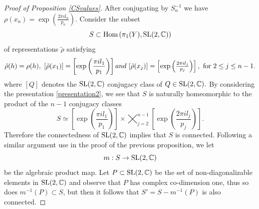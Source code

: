\begin{proof}[Proof of Proposition \ref{CSvalues}]
After conjugating by $S_n^{-1}$ we have $\rho(x_n)=\exp\left(\frac{2\pi i l_n}{p_n}\right).$ Consider the subset $$S\subset \text{Hom}\left(\pi_1(Y),\operatorname{SL}(2,\mathbb{C})\right) $$ of representations $\tilde{\rho}$ satisfying
\begin{equation}
\tilde{\rho}(h)=\rho(h), \ [\tilde{\rho}(x_1)]=\left[\exp\left(\frac{\pi il_1}{p_1}\right)\right]\, $$
and
$$\ [\tilde{\rho}(x_j)]=\left[\exp\left(\frac{2\pi il_j}{p_j}\right)\right], \ \text{for }2\leq j\leq n-1.
\end{equation}
where $[Q]$ denotes the $\operatorname{SL}(2,\mathbb{C})$ conjugacy class of $Q \in \operatorname{SL}(2,\mathbb{C}).$ By considering the presentation \eqref{presentation2}, we see that $S$ is naturally homeomorphic to the product of the $n-1$ conjugacy classes
\begin{equation}
S\simeq \left[\exp\left(\frac{\pi il_1}{p_1}\right)\right]\times  \bigtimes_{j=2}^{n-1} \left[\exp\left(\frac{2\pi il_j}{p_j}\right)\right].
\end{equation}
 Therefore the connectedness of $\operatorname{SL}(2,\mathbb{C})$ implies that $S$ is connected. Following a similar argument use in the proof of the previous proposition, we let 
 $$m : S \rightarrow \operatorname{SL}(2,\mathbb{C})$$
  be the algebraic product map. Let $P\subset \operatorname{SL}(2,\mathbb{C})$ be the set of non-diagonalizable elements in $\operatorname{SL}(2,\mathbb{C})$ and observe that $P$ has complex co-dimension one, thus so does $m^{-1}(P) \subset S$, but then it follows that $S' = S- m^{-1}(P)$ is also connected.
 

\end{proof}

